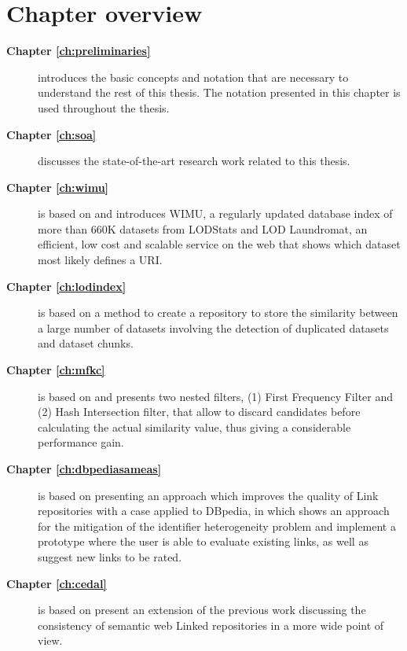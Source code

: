 \section{Chapter overview}
\begin{description}
    \item[\textbf{Chapter \ref{ch:preliminaries}}] introduces the basic concepts and notation that are necessary to understand the rest of this thesis. The notation presented in this chapter is used throughout the thesis.
    
    \item[\textbf{Chapter \ref{ch:soa}}] discusses the state-of-the-art research work related to this thesis.
    
    \item[\textbf{Chapter \ref{ch:wimu}}] is based on \cite{valdestilhas2018my} and introduces WIMU, a regularly updated database index of more than 660K datasets from LODStats and LOD Laundromat, an efficient, low cost and scalable service on the web that shows which dataset most likely defines a URI.
    
    \item[\textbf{Chapter \ref{ch:lodindex}}] is based on \cite{valdestilhas2019ReLOD} a method to create a repository to store the similarity between a large number of datasets involving the detection of duplicated datasets and dataset chunks. %
    
    \item[\textbf{Chapter \ref{ch:mfkc}}] is based on \cite{valdestilhas2017high} and presents two nested filters, (1) First Frequency Filter and (2) Hash Intersection filter, that allow to discard candidates before calculating the actual similarity value, thus giving a considerable performance gain.
    
    \item[\textbf{Chapter \ref{ch:dbpediasameas}}] is based on \cite{valdestilhasdbpediasameas} presenting an approach which improves the quality of Link repositories with a case applied to DBpedia, in which shows an approach for the mitigation of the identifier heterogeneity problem and implement a prototype where the user is able to evaluate existing links, as well as suggest new links to be rated.
    
    \item[\textbf{Chapter \ref{ch:cedal}}] is based on \cite{valdestilhas2017cedal} present an extension of the previous work \cite{valdestilhasdbpediasameas} discussing the consistency of semantic web Linked repositories in a more wide point of view.
    

\end{description}
